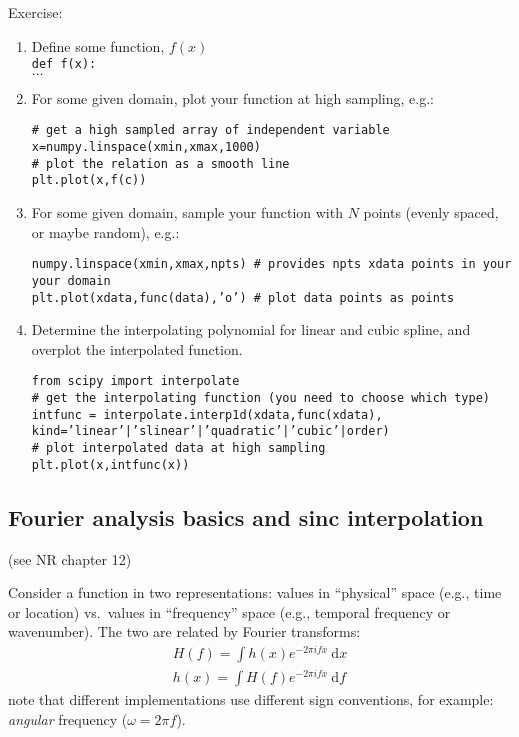 \documentclass[12pt]{article}
\begin{document}
Exercise:
\begin{enumerate}
    \item Define some function, $f(x)$\\
        \texttt{def f(x):}\\
            $\ldots$
    \item For some given domain, plot your function at high sampling, e.g.:

        \texttt{\# get a high sampled array of independent variable\\
        x=numpy.linspace(xmin,xmax,1000)\\
        \# plot the relation as a smooth line\\
        plt.plot(x,f(c))}
    \item For some given domain, sample your function with $N$ points
        (evenly spaced, or maybe random), e.g.:

        \texttt{numpy.linspace(xmin,xmax,npts) \# provides npts xdata
        points in your your domain\\
        plt.plot(xdata,func(data),'o') \# plot data points as points}
    \item Determine the interpolating polynomial for linear and cubic
        spline, and overplot the interpolated function.

        \texttt{from scipy import interpolate\\
        \# get the interpolating function (you need to choose which type)\\
        intfunc = interpolate.interp1d(xdata,func(xdata),
        kind='linear'|'slinear'|'quadratic'|'cubic'|order)\\
        \# plot interpolated data at high sampling\\
        plt.plot(x,intfunc(x))}
\end{enumerate}

\subsection{Fourier analysis basics and sinc interpolation}
(see NR chapter 12)

Consider a function in two representations: values in
``physical'' space (e.g., time or location) vs.\ values in ``frequency'' space
(e.g., temporal frequency or wavenumber). The two are related by Fourier
transforms:
\begin{align*}
    H(f) = \int \! h(x)e^{-2 \pi i f x} \ \textrm{d}x \\
    h(x) = \int \! H(f)e^{-2 \pi i f x} \ \textrm{d}f
\end{align*}
note that different implementations use different sign conventions,
for example: \emph{angular} frequency ($\omega = 2\pi f$).
\end{document}
